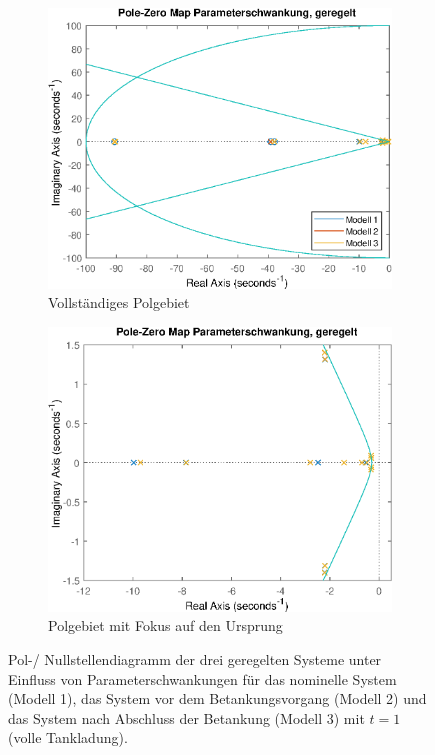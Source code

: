 \begin{figure}[h] %
	\centering
	\begin{subfigure}{.49\textwidth}
		\centering
		\includegraphics[width=\linewidth]{./Bilder/pzmap_controlled_schwankung.eps}
		\caption{Vollständiges Polgebiet}
		\label{fig:pzmap_controlled_schwankung_ohne_zoom}
	\end{subfigure}
	\hfill
	\begin{subfigure}{.49\textwidth}
		\centering
		\includegraphics[width=\linewidth]{./Bilder/pzmap_controlled_schwankung_zoom.eps}
		\caption{Polgebiet mit Fokus auf den Ursprung}
		\label{fig:pzmap_controlled_schwankung_zoom}
	\end{subfigure}
	\caption{Pol-/ Nullstellendiagramm der drei geregelten Systeme unter Einfluss von Parameterschwankungen für das nominelle System (Modell 1), das System vor dem Betankungsvorgang (Modell 2) und das System nach Abschluss der Betankung (Modell 3) mit $t=1$ (volle Tankladung).}
	\label{fig:pzmap_controlled_schwankung}
\end{figure}

